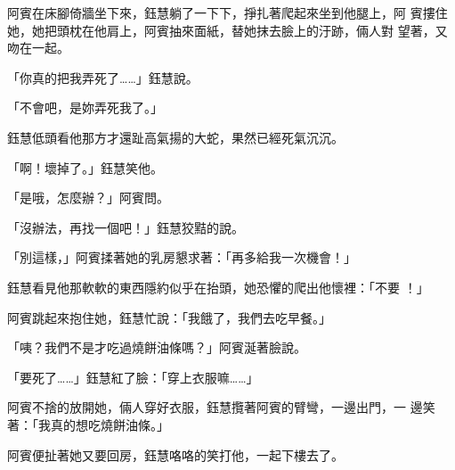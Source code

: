 阿賓在床腳倚牆坐下來，鈺慧躺了一下下，掙扎著爬起來坐到他腿上，阿
賓摟住她，她把頭枕在他肩上，阿賓抽來面紙，替她抹去臉上的汙跡，倆人對
望著，又吻在一起。

「你真的把我弄死了……」鈺慧說。

「不會吧，是妳弄死我了。」

鈺慧低頭看他那方才還趾高氣揚的大蛇，果然已經死氣沉沉。

「啊！壞掉了。」鈺慧笑他。

「是哦，怎麼辦？」阿賓問。

「沒辦法，再找一個吧！」鈺慧狡黠的說。

「別這樣，」阿賓揉著她的乳房懇求著：「再多給我一次機會！」

鈺慧看見他那軟軟的東西隱約似乎在抬頭，她恐懼的爬出他懷裡：「不要
！」

阿賓跳起來抱住她，鈺慧忙說：「我餓了，我們去吃早餐。」

「咦？我們不是才吃過燒餅油條嗎？」阿賓涎著臉說。

「要死了……」鈺慧紅了臉：「穿上衣服嘛……」

阿賓不捨的放開她，倆人穿好衣服，鈺慧攬著阿賓的臂彎，一邊出門，一
邊笑著：「我真的想吃燒餅油條。」

阿賓便扯著她又要回房，鈺慧咯咯的笑打他，一起下樓去了。










